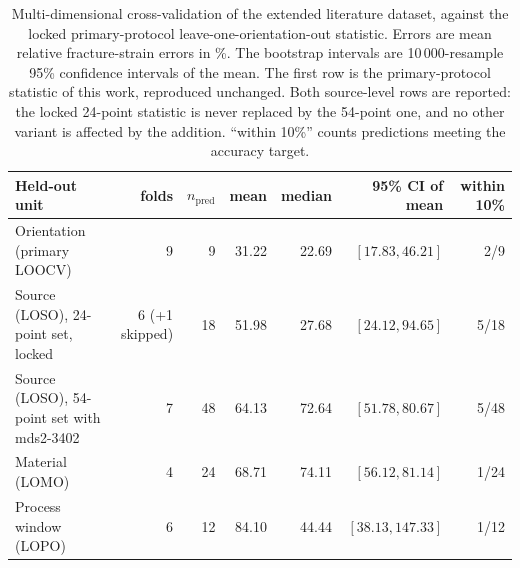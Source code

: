 \documentclass[11pt,a4paper,twocolumn]{article}
\begin{document}
\begin{table}[htbp]
\centering
\caption{Multi-dimensional cross-validation of the extended literature dataset, against the locked primary-protocol leave-one-orientation-out statistic. Errors are mean relative fracture-strain errors in \%. The bootstrap intervals are 10\,000-resample 95\% confidence intervals of the mean. The first row is the primary-protocol statistic of this work, reproduced unchanged. Both source-level rows are reported: the locked 24-point statistic is never replaced by the 54-point one, and no other variant is affected by the addition. ``within 10\%'' counts predictions meeting the accuracy target.}
\label{tab:cv_variants}
\footnotesize
\setlength{\tabcolsep}{3pt}
\begin{tabular}{p{}rrrrrr}
\toprule
\textbf{Held-out unit} & \textbf{folds} & \textbf{$n_{\mathrm{pred}}$} & \textbf{mean} & \textbf{median} & \textbf{95\% CI of mean} & \textbf{within 10\%} \\
\midrule
Orientation (primary LOOCV) & 9 & 9 & 31.22 & 22.69 & $[17.83, 46.21]$ & 2/9 \\
Source (LOSO), 24-point set, locked & 6 (+1 skipped) & 18 & 51.98 & 27.68 & $[24.12, 94.65]$ & 5/18 \\
Source (LOSO), 54-point set with mds2-3402 & 7 & 48 & 64.13 & 72.64 & $[51.78, 80.67]$ & 5/48 \\
Material (LOMO) & 4 & 24 & 68.71 & 74.11 & $[56.12, 81.14]$ & 1/24 \\
Process window (LOPO) & 6 & 12 & 84.10 & 44.44 & $[38.13, 147.33]$ & 1/12 \\
\bottomrule
\end{tabular}
\end{table}
\end{document}
